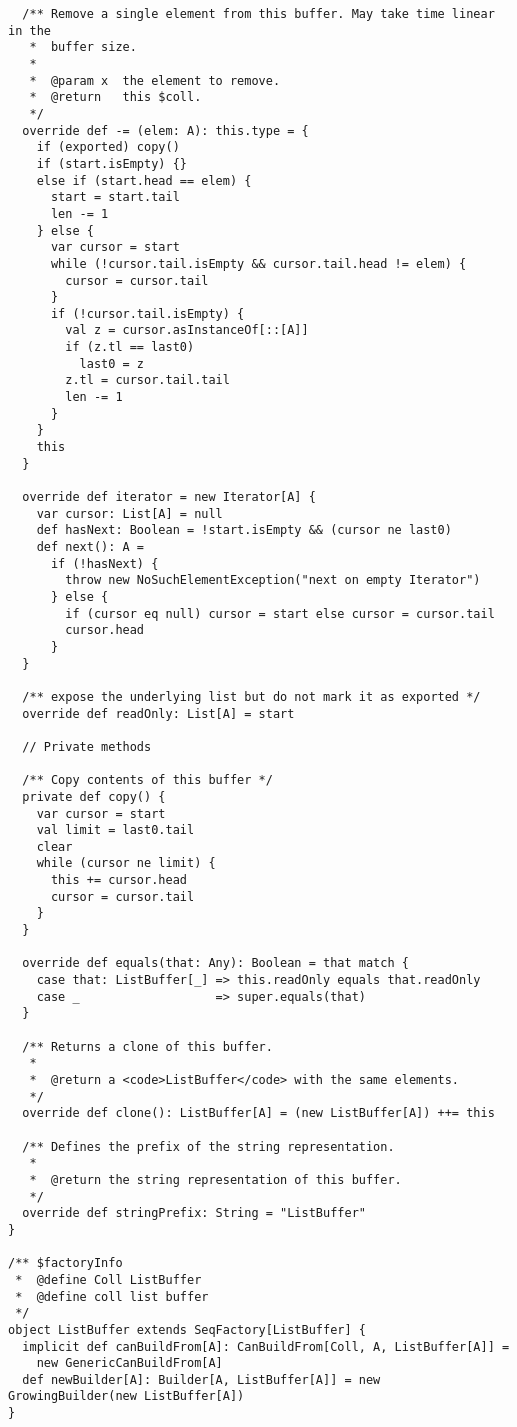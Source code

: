 \begin{lstlisting}
  /** Remove a single element from this buffer. May take time linear in the
   *  buffer size.
   *
   *  @param x  the element to remove.
   *  @return   this $coll.
   */
  override def -= (elem: A): this.type = {
    if (exported) copy()
    if (start.isEmpty) {}
    else if (start.head == elem) {
      start = start.tail
      len -= 1
    } else {
      var cursor = start
      while (!cursor.tail.isEmpty && cursor.tail.head != elem) {
        cursor = cursor.tail
      }
      if (!cursor.tail.isEmpty) {
        val z = cursor.asInstanceOf[::[A]]
        if (z.tl == last0)
          last0 = z
        z.tl = cursor.tail.tail
        len -= 1
      }
    }
    this
  }

  override def iterator = new Iterator[A] {
    var cursor: List[A] = null
    def hasNext: Boolean = !start.isEmpty && (cursor ne last0)
    def next(): A =
      if (!hasNext) {
        throw new NoSuchElementException("next on empty Iterator")
      } else {
        if (cursor eq null) cursor = start else cursor = cursor.tail
        cursor.head
      }
  }

  /** expose the underlying list but do not mark it as exported */
  override def readOnly: List[A] = start

  // Private methods

  /** Copy contents of this buffer */
  private def copy() {
    var cursor = start
    val limit = last0.tail
    clear
    while (cursor ne limit) {
      this += cursor.head
      cursor = cursor.tail
    }
  }

  override def equals(that: Any): Boolean = that match {
    case that: ListBuffer[_] => this.readOnly equals that.readOnly
    case _                   => super.equals(that)
  }

  /** Returns a clone of this buffer.
   *
   *  @return a <code>ListBuffer</code> with the same elements.
   */
  override def clone(): ListBuffer[A] = (new ListBuffer[A]) ++= this

  /** Defines the prefix of the string representation.
   *
   *  @return the string representation of this buffer.
   */
  override def stringPrefix: String = "ListBuffer"
}

/** $factoryInfo
 *  @define Coll ListBuffer
 *  @define coll list buffer
 */
object ListBuffer extends SeqFactory[ListBuffer] {
  implicit def canBuildFrom[A]: CanBuildFrom[Coll, A, ListBuffer[A]] =
    new GenericCanBuildFrom[A]
  def newBuilder[A]: Builder[A, ListBuffer[A]] = new GrowingBuilder(new ListBuffer[A])
}
\end{lstlisting}

